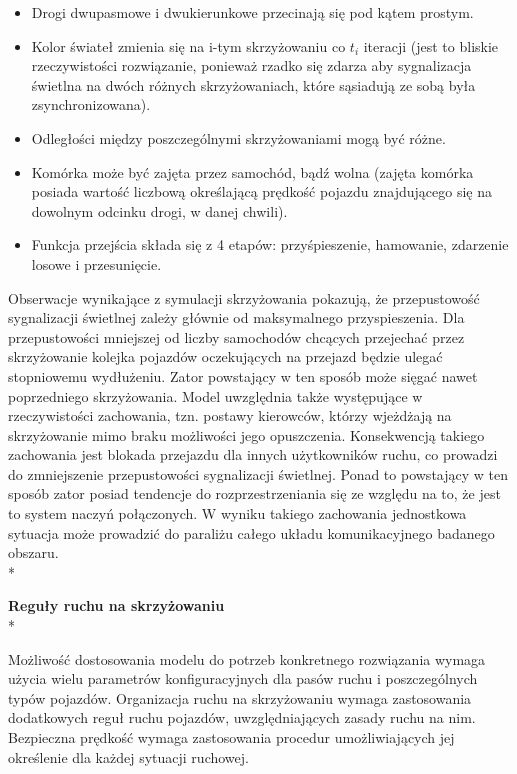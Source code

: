 \documentclass{sprawozdanie-agh}
\begin{document}
	\begin{itemize}
		\item Drogi dwupasmowe i dwukierunkowe przecinają się pod kątem prostym.
		\item Kolor świateł zmienia się na i-tym skrzyżowaniu co $t_{i}$ iteracji (jest to bliskie rzeczywistości rozwiązanie, ponieważ rzadko się zdarza aby sygnalizacja świetlna na dwóch różnych skrzyżowaniach, które sąsiadują ze sobą była zsynchronizowana).
		\item Odległości między poszczególnymi skrzyżowaniami mogą być różne.
		\item Komórka może być zajęta przez samochód, bądź wolna (zajęta komórka posiada wartość liczbową określającą prędkość pojazdu znajdującego się na dowolnym odcinku drogi, w danej chwili).
		\item Funkcja przejścia składa się z 4 etapów: przyśpieszenie, hamowanie, zdarzenie losowe i przesunięcie.
	\end{itemize}

	Obserwacje wynikające z symulacji skrzyżowania pokazują, że przepustowość sygnalizacji świetlnej zależy głównie od maksymalnego przyspieszenia. Dla przepustowości mniejszej od liczby samochodów chcących przejechać przez skrzyżowanie kolejka pojazdów oczekujących na przejazd będzie ulegać stopniowemu wydłużeniu. Zator powstający w ten sposób może sięgać nawet poprzedniego skrzyżowania. Model uwzględnia także występujące w rzeczywistości zachowania, tzn. postawy kierowców, którzy wjeżdżają na skrzyżowanie mimo braku możliwości jego opuszczenia. Konsekwencją takiego zachowania jest blokada przejazdu dla innych użytkowników ruchu, co prowadzi do zmniejszenie przepustowości sygnalizacji świetlnej. Ponad to powstający w ten sposób zator posiad tendencje do rozprzestrzeniania się ze względu na to, że jest to system naczyń połączonych. W wyniku takiego zachowania jednostkowa sytuacja może prowadzić do paraliżu całego układu komunikacyjnego badanego obszaru. \\*

	\textbf {Reguły ruchu na skrzyżowaniu} \\*

	Możliwość dostosowania modelu do potrzeb konkretnego rozwiązania wymaga użycia wielu parametrów konfiguracyjnych dla pasów ruchu i poszczególnych typów pojazdów. Organizacja ruchu na skrzyżowaniu wymaga zastosowania dodatkowych reguł ruchu pojazdów, uwzględniających zasady ruchu na nim. Bezpieczna prędkość wymaga zastosowania procedur umożliwiających jej określenie dla każdej sytuacji ruchowej.
\end{document}
